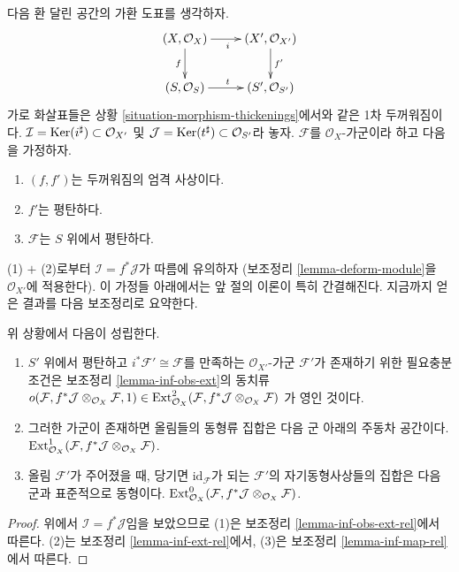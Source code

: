 \noindent
다음 환 달린 공간의 가환 도표를 생각하자.
$$
\xymatrix{
(X, \mathcal{O}_X) \ar[r]_i \ar[d]_f & (X', \mathcal{O}_{X'}) \ar[d]^{f'} \\
(S, \mathcal{O}_S) \ar[r]^t & (S', \mathcal{O}_{S'})
}
$$
가로 화살표들은 상황 \ref{situation-morphism-thickenings}에서와 같은
1차 두꺼워짐이다. $\mathcal{I} = \mathop{\mathrm{Ker}}(i^\sharp) \subset \mathcal{O}_{X'}$
및 $\mathcal{J} = \mathop{\mathrm{Ker}}(t^\sharp) \subset \mathcal{O}_{S'}$라 놓자.
$\mathcal{F}$를 $\mathcal{O}_X$-가군이라 하고 다음을 가정하자.
\begin{enumerate}
\item $(f, f')$는 두꺼워짐의 엄격 사상이다.
\item $f'$는 평탄하다.
\item $\mathcal{F}$는 $S$ 위에서 평탄하다.
\end{enumerate}
(1) $+$ (2)로부터 $\mathcal{I} = f^*\mathcal{J}$가 따름에 유의하자
(보조정리 \ref{lemma-deform-module}을 $\mathcal{O}_{X'}$에 적용한다).
이 가정들 아래에서는 앞 절의 이론이 특히 간결해진다. 지금까지 얻은
결과를 다음 보조정리로 요약한다.

\begin{lemma}
\label{lemma-flat}
위 상황에서 다음이 성립한다.
\begin{enumerate}
\item $S'$ 위에서 평탄하고 $i^*\mathcal{F}' \cong \mathcal{F}$를
만족하는 $\mathcal{O}_{X'}$-가군 $\mathcal{F}'$가 존재하기 위한
필요충분조건은 보조정리 \ref{lemma-inf-obs-ext}의 동치류
$o(\mathcal{F}, f^*\mathcal{J} \otimes_{\mathcal{O}_X} \mathcal{F}, 1)
\in \mathop{\mathrm{Ext}}\nolimits^2_{\mathcal{O}_X}(
\mathcal{F}, f^*\mathcal{J} \otimes_{\mathcal{O}_X} \mathcal{F})$
가 영인 것이다.
\item 그러한 가군이 존재하면 올림들의 동형류 집합은 다음 군 아래의
주동차 공간이다.
$\mathop{\mathrm{Ext}}\nolimits^1_{\mathcal{O}_X}(
\mathcal{F}, f^*\mathcal{J} \otimes_{\mathcal{O}_X} \mathcal{F})$.
\item 올림 $\mathcal{F}'$가 주어졌을 때, 당기면
$\text{id}_\mathcal{F}$가 되는 $\mathcal{F}'$의 자기동형사상들의
집합은 다음 군과 표준적으로 동형이다.
$\mathop{\mathrm{Ext}}\nolimits^0_{\mathcal{O}_X}(
\mathcal{F}, f^*\mathcal{J} \otimes_{\mathcal{O}_X} \mathcal{F})$.
\end{enumerate}
\end{lemma}

\begin{proof}
위에서 $\mathcal{I} = f^*\mathcal{J}$임을 보았으므로 (1)은 보조정리
\ref{lemma-inf-obs-ext-rel}에서 따른다. (2)는 보조정리
\ref{lemma-inf-ext-rel}에서, (3)은 보조정리
\ref{lemma-inf-map-rel}에서 따른다.
\end{proof}

